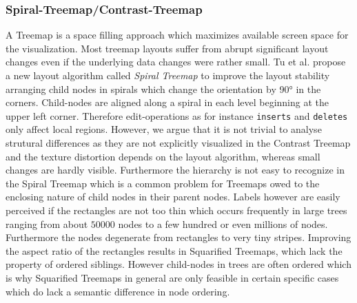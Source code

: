 \subsubsection{Spiral-Treemap/Contrast-Treemap\cite{tu2007visualizing}}
A Treemap is a space filling approach which maximizes available screen space for the visualization. Most treemap layouts suffer from abrupt significant layout changes even if the underlying data changes were rather small. Tu et al. propose a new layout algorithm called \emph{Spiral Treemap} to improve the layout stability arranging child nodes in spirals which change the orientation by 90° in the corners. Child-nodes are aligned along a spiral in each level beginning at the upper left corner. Therefore edit-operations as for instance \texttt\texttt{inserts} and \texttt{deletes} only affect local regions. However, we argue that it is not trivial to analyse strutural differences as they are not explicitly visualized in the Contrast Treemap and the texture distortion depends on the layout algorithm, whereas small changes are hardly visible. Furthermore the hierarchy is not easy to recognize in the Spiral Treemap which is a common problem for Treemaps owed to the enclosing nature of child nodes in their parent nodes. Labels however are easily perceived if the rectangles are not too thin which occurs frequently in large trees ranging from about $50000$ nodes to a few hundred or even millions of nodes. Furthermore the nodes degenerate from rectangles to very tiny stripes. Improving the aspect ratio of the rectangles results in Squarified Treemaps\cite{bruls2000squarified}, which lack the property of ordered siblings. However child-nodes in trees are often ordered which is why Squarified Treemaps in general are only feasible in certain specific cases which do lack a semantic difference in node ordering. %

